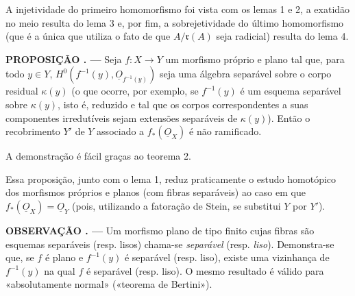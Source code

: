 \documentclass[11pt,twoside,openany]{book}
\numberwithin{equation}{section}
\newcommand{\src}[1]{%
  \phantomsection\hypertarget{src:#1}{}%
  \marginpar{\raggedleft\footnotesize\sffamily #1}%
}
\newcommand{\Osh}{\underline{O}}
\theoremstyle{plain}
\theoremstyle{definition}
\theoremstyle{remark}
\newcommand{\result}[2]{%
  \par\medskip\noindent\textbf{#1%
  \if\relax\detokenize{#2}\relax\else\space#2\fi. ---}\enspace
}
\newcommand{\FgaUnitKey}{frontmatter}
\renewcommand{\src}[1]{%
  \phantomsection\hypertarget{src:\FgaUnitKey:#1}{}%
  \marginpar{\raggedleft\footnotesize\sffamily #1}%
}
\begin{document}
A injetividade do primeiro homomorfismo foi vista com os lemas 1 e 2, a
exatidão no meio resulta do lema 3 e, por fim, a sobrejetividade do
último homomorfismo (que é a única que utiliza o fato de que
$A/\mathfrak r(A)$ seja radicial) resulta do lema 4.

\result{PROPOSIÇÃO}{4} Seja $f:X\longrightarrow Y$ um morfismo próprio e plano
tal que, para todo $y\in Y$, $H^0(f^{-1}(y),\Osh_{f^{-1}(y)})$ seja uma álgebra
separável sobre o corpo residual $\kappa(y)$ (o que ocorre, por exemplo, se
$f^{-1}(y)$ é um esquema separável sobre $\kappa(y)$, isto é, reduzido e tal
que os corpos correspondentes a suas componentes irredutíveis sejam
extensões separáveis de $\kappa(y)$). Então o recobrimento $Y'$ de $Y$
associado a $f_*(\Osh_X)$ é não ramificado.

A demonstração é fácil graças ao teorema 2.

\src{213}
Essa proposição, junto com o lema 1, reduz praticamente o estudo
homotópico dos morfismos próprios e planos (com fibras separáveis) ao caso em
que $f_*(\Osh_X)=\Osh_Y$ (pois, utilizando a fatoração de Stein, se
substitui $Y$ por $Y'$).

\result{OBSERVAÇÃO}{} Um morfismo plano de tipo finito cujas fibras são
esquemas separáveis (resp. lisos) chama-se \emph{separável} (resp.
\emph{liso}). Demonstra-se que, se $f$ é plano e $f^{-1}(y)$ é separável
(resp. liso), existe uma vizinhança de $f^{-1}(y)$ na qual $f$ é separável
(resp. liso). O mesmo resultado é válido para «absolutamente normal»
(«teorema de Bertini»).
\end{document}
